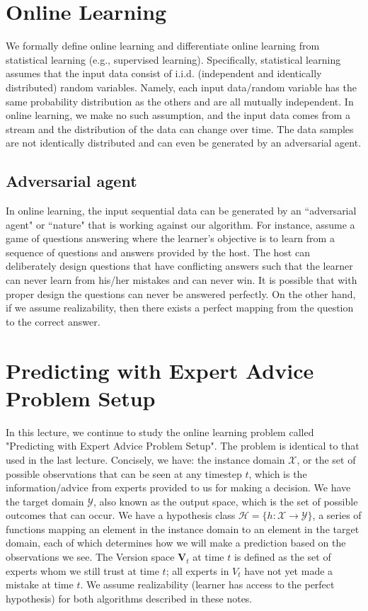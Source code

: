 \documentclass[11pt]{article}
\newcommand{\HH}{\mathcal{H}}
\newcommand{\X}{\mathcal{X}}
\newcommand{\Y}{\mathcal{Y}}
\newcommand{\V}{\mathbf{V}}
\begin{document}
\section{Online Learning}
We formally define online learning and differentiate online learning from statistical learning (e.g., supervised learning). Specifically, statistical learning assumes that the input data consist of i.i.d. (independent and identically distributed) random variables. Namely, each input data/random variable has the same probability distribution as the others and are all mutually independent. In online learning, we make no such assumption, and the input data comes from a stream and the distribution of the data can change over time. The data samples are not identically distributed and can even be generated by an adversarial agent. 

\subsection{Adversarial agent}
In online learning, the input sequential data can be generated by an ``adversarial agent" or ``nature" that is working against our algorithm. For instance, assume a game of questions answering where the learner's objective is to learn from a sequence of questions and answers provided by the host. The host can deliberately design questions that have conflicting answers such that the learner can never learn from his/her mistakes and can never win. It is possible that with proper design the questions can never be answered perfectly. On the other hand, if we assume realizability, then there exists a perfect mapping from the question to the correct answer. 

\section{Predicting with Expert Advice Problem Setup}
In this lecture, we continue to study the online learning problem called "Predicting with Expert Advice Problem Setup". The problem is identical to that used in the last lecture. Concisely, we have: the instance domain $\X$, or the set of possible observations that can be seen at any timestep $t$, which is the information/advice from experts provided to us for making a decision. We have the target domain $\Y$, also known as the output space, which is the set of possible outcomes that can occur. We have a hypothesis class $\HH = \{h: \X \rightarrow \Y \}$, a series of functions mapping an element in the instance domain to an element in the target domain, each of which determines how we will make a prediction based on the observations we see. The Version space $\V_t$ at time $t$ is defined as the set of experts whom we still trust at time $t$; all experts in $V_t$ have not yet made a mistake at time $t$. We assume realizability (learner has access to the perfect hypothesis) for both algorithms described in these notes.
\end{document}
